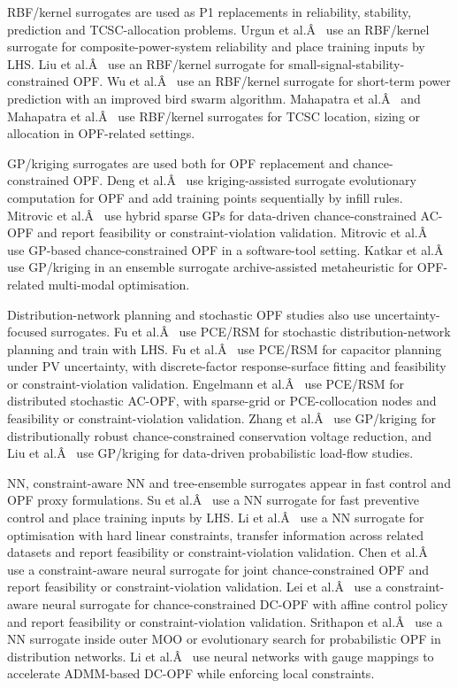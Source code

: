 \documentclass[final,5p,times,twocolumn]{elsarticle}
\begin{document}
RBF/kernel surrogates are used as P1 replacements in reliability,
stability, prediction and TCSC-allocation problems. Urgun et
al.Â~\cite{Urgun20202791} use an RBF/kernel surrogate for
composite-power-system reliability and place training inputs by LHS. Liu
et al.Â~\cite{Liu20223726} use an RBF/kernel surrogate for
small-signal-stability-constrained OPF. Wu et al.Â~\cite{Wu2021__2} use an
RBF/kernel surrogate for short-term power prediction with an improved
bird swarm algorithm. Mahapatra et al.Â~\cite{Mahapatra20161921} and
Mahapatra et al.Â~\cite{Mahapatra2022721} use RBF/kernel surrogates for TCSC
location, sizing or allocation in OPF-related settings.

GP/kriging surrogates are used both for OPF replacement and
chance-constrained OPF. Deng et al.Â~\cite{Deng2020831} use kriging-assisted
surrogate evolutionary computation for OPF and add training points
sequentially by infill rules. Mitrovic et al.Â~\cite{Mitrovic2023__2} use
hybrid sparse GPs for data-driven chance-constrained AC-OPF and report
feasibility or constraint-violation validation. Mitrovic et
al.Â~\cite{Mitrovic2023__3} use GP-based chance-constrained OPF in a
software-tool setting. Katkar et al.Â~\cite{Katkar2025} use GP/kriging in an
ensemble surrogate archive-assisted metaheuristic for OPF-related
multi-modal optimisation.

Distribution-network planning and stochastic OPF studies also use
uncertainty-focused surrogates. Fu et al.Â~\cite{Fu20202904} use PCE/RSM for
stochastic distribution-network planning and train with LHS. Fu et
al.Â~\cite{Fu2022} use PCE/RSM for capacitor planning under PV uncertainty,
with discrete-factor response-surface fitting and feasibility or
constraint-violation validation. Engelmann et al.Â~\cite{Engelmann20186188}
use PCE/RSM for distributed stochastic AC-OPF, with sparse-grid or
PCE-collocation nodes and feasibility or constraint-violation
validation. Zhang et al.Â~\cite{Zhang2024821} use GP/kriging for
distributionally robust chance-constrained conservation voltage
reduction, and Liu et al.Â~\cite{Liu20222679} use GP/kriging for data-driven
probabilistic load-flow studies.

NN, constraint-aware NN and tree-ensemble surrogates appear in fast
control and OPF proxy formulations. Su et al.Â~\cite{Su2022315} use a NN
surrogate for fast preventive control and place training inputs by LHS.
Li et al.Â~\cite{Li202359995} use a NN surrogate for optimisation with hard
linear constraints, transfer information across related datasets and
report feasibility or constraint-violation validation. Chen et
al.Â~\cite{Chen2023657} use a constraint-aware neural surrogate for joint
chance-constrained OPF and report feasibility or constraint-violation
validation. Lei et al.Â~\cite{Lei20247417} use a constraint-aware neural
surrogate for chance-constrained DC-OPF with affine control policy and
report feasibility or constraint-violation validation. Srithapon et
al.Â~\cite{Srithapon202134395} use a NN surrogate inside outer MOO or
evolutionary search for probabilistic OPF in distribution networks. Li
et al.Â~\cite{Li2023__2} use neural networks with gauge mappings to
accelerate ADMM-based DC-OPF while enforcing local constraints.
\end{document}
